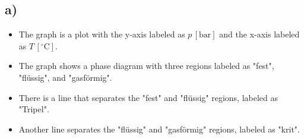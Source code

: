 

\subsection*{a)}

\begin{itemize}
    \item The graph is a plot with the y-axis labeled as $p \, [\text{bar}]$ and the x-axis labeled as $T \, [^\circ \text{C}]$.
    \item The graph shows a phase diagram with three regions labeled as "fest", "flüssig", and "gasförmig".
    \item There is a line that separates the "fest" and "flüssig" regions, labeled as "Tripel".
    \item Another line separates the "flüssig" and "gasförmig" regions, labeled as "krit".
\end{itemize}